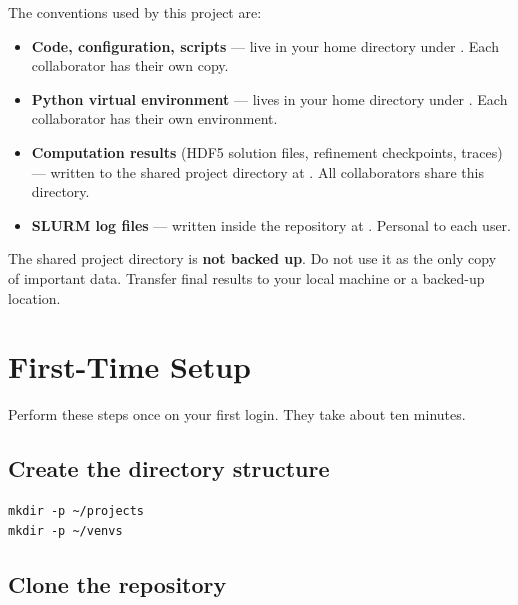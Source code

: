 \documentclass[11pt,a4paper]{article}
\begin{document}
The conventions used by this project are:

\begin{itemize}[leftmargin=1.5em]
  \item \textbf{Code, configuration, scripts} --- live in your home directory
        under .
        Each collaborator has their own copy.
  \item \textbf{Python virtual environment} --- lives in your home directory
        under .
        Each collaborator has their own environment.
  \item \textbf{Computation results} (HDF5 solution files, refinement
        checkpoints, traces) --- written to the shared project directory at
        .
        All collaborators share this directory.
  \item \textbf{SLURM log files} --- written inside the repository at
        .
        Personal to each user.
\end{itemize}

\begin{warnbox}
The shared project directory  is
\textbf{not backed up}.  Do not use it as the only copy of important data.
Transfer final results to your local machine or a backed-up location.
\end{warnbox}

\section{First-Time Setup}
\label{sec:setup}

Perform these steps once on your first login.  They take about ten minutes.

\subsection{Create the directory structure}

\begin{lstlisting}[style=shell]
mkdir -p ~/projects
mkdir -p ~/venvs
\end{lstlisting}

\subsection{Clone the repository}
\end{document}
